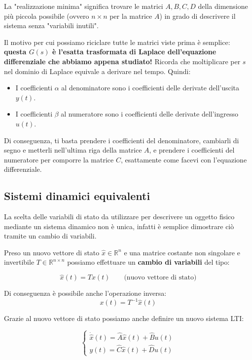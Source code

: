 \documentclass[a4paper,12pt]{article}
\begin{document}
	La "realizzazione minima" significa trovare le matrici $A, B, C, D$ della dimensione più piccola possibile (ovvero $n \times n$ per la matrice $A$) in grado di descrivere il sistema senza "variabili inutili".
	
	Il motivo per cui possiamo riciclare tutte le matrici viste prima è semplice: \textbf{questa $G(s)$ è l'esatta trasformata di Laplace dell'equazione differenziale che abbiamo appena studiato!}
	Ricorda che moltiplicare per $s$ nel dominio di Laplace equivale a derivare nel tempo. Quindi:
	\begin{itemize}
		\item I coefficienti $\alpha$ al denominatore sono i coefficienti delle derivate dell'uscita $y(t)$.
		\item I coefficienti $\beta$ al numeratore sono i coefficienti delle derivate dell'ingresso $u(t)$.
	\end{itemize}
	Di conseguenza, ti basta prendere i coefficienti del denominatore, cambiarli di segno e metterli nell'ultima riga della matrice $A$, e prendere i coefficienti del numeratore per comporre la matrice $C$, esattamente come facevi con l'equazione differenziale.
	
	\subsection{Sistemi dinamici equivalenti}
	
	La scelta delle variabili di stato da utilizzare per descrivere un oggetto fisico mediante un sistema dinamico non è unica, infatti è semplice dimostrare ciò tramite un cambio di variabili.
	
	Preso un nuovo vettore di stato $\hat{x} \in \mathbb{R}^n$ e una matrice costante non singolare e invertibile $T \in \mathbb{R}^{n \times n}$ possiamo effettuare un \textbf{cambio di variabili} del tipo:
	
	$$
	\hat{x}(t) = T x(t) \qquad \text{(nuovo vettore di stato)}
	$$
	
	Di conseguenza è possibile anche l'operazione inversa:
	$$
	x(t) = T^{-1} \hat{x}(t)
	$$
	
	Grazie al nuovo vettore di stato possiamo anche definire un nuovo sistema LTI:
	
	$$
	\begin{cases} 
		\dot{\hat{x}}(t) = \hat{A}\hat{x}(t) + \hat{B}u(t) \\ 
		y(t) = \hat{C}\hat{x}(t) + \hat{D}u(t) 
	\end{cases}
	$$
	
\end{document}
